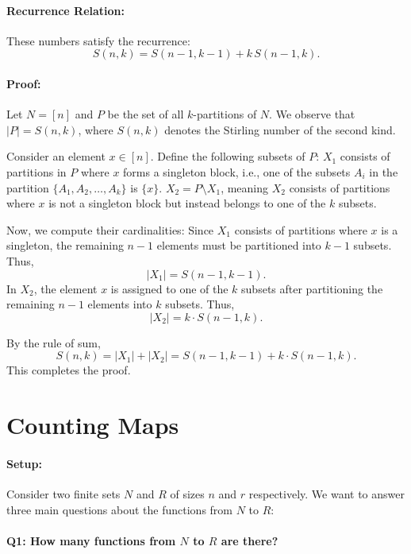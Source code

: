\documentclass[docmute]{article}
\begin{document}
\paragraph{Recurrence Relation:}  
These numbers satisfy the recurrence:
\[
S(n,k) = S(n-1,k-1) + k\, S(n-1,k).
\]
\paragraph{Proof:}  
Let \( N = [n] \) and \( P \) be the set of all \( k \)-partitions of \( N \). We observe that \( |P| = S(n, k) \), where \( S(n, k) \) denotes the Stirling number of the second kind.  

Consider an element \( x \in [n] \). Define the following subsets of \( P \):  
 \( X_1 \) consists of partitions in \( P \) where \( x \) forms a singleton block, i.e., one of the subsets \( A_i \) in the partition \( \{A_1, A_2, \dots, A_k\} \) is \( \{x\} \).  
 \( X_2 = P \setminus X_1 \), meaning \( X_2 \) consists of partitions where \( x \) is not a singleton block but instead belongs to one of the \( k \) subsets.  

Now, we compute their cardinalities:  
 Since \( X_1 \) consists of partitions where \( x \) is a singleton, the remaining \( n-1 \) elements must be partitioned into \( k-1 \) subsets. Thus,  
  \[
  |X_1| = S(n-1, k-1).
  \]  
 In \( X_2 \), the element \( x \) is assigned to one of the \( k \) subsets after partitioning the remaining \( n-1 \) elements into \( k \) subsets. Thus,  
  \[
  |X_2| = k \cdot S(n-1, k).
  \]  

By the rule of sum,  
\[
S(n, k) = |X_1| + |X_2| = S(n-1, k-1) + k \cdot S(n-1, k).
\]
This completes the proof.

\section{Counting Maps}

\paragraph{Setup:}
Consider two finite sets \(N\) and \(R\) of sizes \(n\) and \(r\) respectively. We want to answer three main questions about the functions from \(N\) to \(R\): 

\paragraph{Q1: How many functions from \(N\) to \(R\) are there?}
\end{document}
